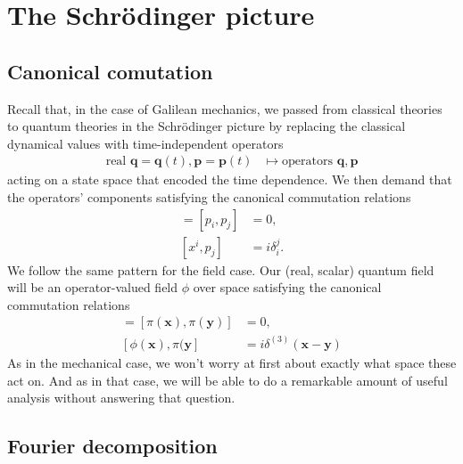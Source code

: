 \documentclass[12 pt]{article}
\newcommand{\B}[1]{\mathbf{#1}}
\numberwithin{equation}{section}
\begin{document}
\section{The Schr\"{o}dinger picture}

\subsection{Canonical comutation}

Recall that, in the case of Galilean mechanics, we passed from classical theories to quantum theories in the Schr\"{o}dinger picture by replacing the classical dynamical values with time-independent operators  \begin{align*}
    \mbox{real } \B{q} = \B{q}(t), \B{p} = \B{p}(t) & \mapsto \mbox{operators } \B{q}, \B{p}
\end{align*}
acting on a state space that encoded the time dependence. We then demand that the operators' components satisfying the canonical commutation relations \begin{align*}
[x^i, x^j] = [p_i, p_j] & = 0, \\
[x^i, p_j] & = i \delta_i ^j.
\end{align*}
We follow the same pattern for the field case. Our (real, scalar) quantum field will be an operator-valued field $\phi$ over space satisfying the canonical commutation relations \begin{align*}
[\phi(\B{x}), \phi(\B{y})] = [\pi(\B{x}), \pi(\B{y})] & = 0, \\
[\phi(\B{x}), \pi(\B{y}] & = i \delta^{(3)}(\B{x} - \B{y})
\end{align*}
As in the mechanical case, we won't worry at first about exactly what space these act on. And as in that case, we will be able to do a remarkable amount of useful analysis without answering that question.

\subsection{Fourier decomposition}
\end{document}
